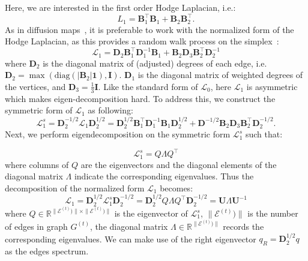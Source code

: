 Here, we are interested in the first order Hodge Laplacian, i.e.:
\begin{equation}
\label{eqn:hodgeLaplacian}
{L}_1 = \mathbf{B}_{1}^\top \mathbf{B}_{1} + \mathbf{B}_{2} \mathbf{B}_{2}^\top.
\end{equation}
As in diffusion maps~\citep{witten1981diffusion}, it is preferable to work with the normalized form of the Hodge Laplacian, as this provides a random walk process on the simplex~\citep{Schaub2020}:
\begin{equation}
\label{eqn:normL1}
\mathcal{L}_1 = \mathbf{D}_2 \mathbf{B}_1^\top \mathbf{D}_1^{-1} \mathbf{B}_1 + \mathbf{B}_2 \mathbf{D}_3 \mathbf{B}_2^\top \mathbf{D}_2^{-1}
\end{equation}
\noindent where $\mathbf{D}_2$ is the diagonal matrix of (adjusted) degrees of each edge, i.e. $\mathbf{D}_2 = \max{(\text{diag}(|\mathbf{B}_2| \mathbf{1}), \mathbf{I})}$. $\mathbf{D}_1$ is the diagonal matrix of weighted degrees of the vertices, and $\mathbf{D}_3=\frac{1}{3}\mathbf{I}$. Like the standard form of $\mathcal{L}_0$, here $\mathcal{L}_1$ is asymmetric which makes eigen-decomposition hard. To address this, we construct the symmetric form of $\mathcal{L}_1$ as following:
\begin{equation}
\label{eqn:normL1sym}
\mathcal{L}_1^s = \mathbf{D}_2^{-1/2} \mathcal{L}_1 \mathbf{D}_2^{1/2} = \mathbf{D}_2^{1/2} \mathbf{B}_1^\top \mathbf{D}_1^{-1} \mathbf{B}_1 \mathbf{D}_2^{1/2} + \mathbf{D}^{-1/2} \mathbf{B}_2 \mathbf{D}_3 \mathbf{B}_2^\top \mathbf{D}_2^{-1/2}.
\end{equation}
\noindent Next, we perform eigendecomposition on the symmetric form $\mathcal{L}_1^s$ such that:

\begin{equation}
\label{eqn:l1symeigendecomposition}
\mathcal{L}_1^s = Q\Lambda Q^\top
\end{equation}
\noindent where columns of $Q$ are the eigenvectors and the diagonal elements of the diagonal matrix $\Lambda$ indicate the corresponding eigenvalues. Thus the decomposition of the normalized form $\mathcal{L}_1$ becomes:
\begin{equation}
\label{eqn:l1decomposition}
\mathcal{L}_1 = \mathbf{D}_2^{1/2} \mathcal{L}_1^s \mathbf{D}_2^{-1/2} =  \mathbf{D}_2^{1/2} Q \Lambda Q^\top \mathbf{D}_2^{-1/2} = \mathbf{U} \Lambda \mathbf{U}^{-1}
\end{equation}
\noindent where $Q\in \mathbb{R}^{\|\mathcal{E}^{(t)})\|\times \|\mathcal{E}^{(t)})\|}$ is the eigenvector of $\mathcal{L}_1^s$, $\|\mathcal{E}^{(t)})\|$ is the number of edges in graph $G^{(t)}$, the diagonal matrix $\Lambda\in \mathbb{R}^{\|\mathcal{E}^{(t)})\|}$ records the corresponding eigenvalues. We can make use of the right eigenvector $q_R = \mathbf{D}_2^{1/2} q$ as the edges spectrum.

